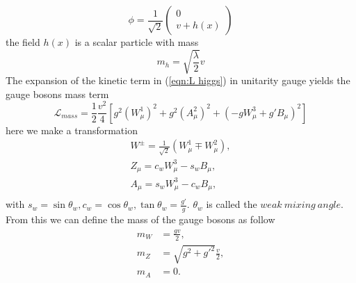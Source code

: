 \documentclass{report}
\numberwithin{equation}{section}
\begin{document}
\begin{equation}\label{7}
\phi=\frac{1}{\sqrt{2}}\begin{pmatrix}
0\\
v+h(x)
\end{pmatrix}
\end{equation}
the field $h(x)$ is a scalar particle with mass
\begin{equation}
m_h=\sqrt{\frac{\lambda}{2}}v
\end{equation}
The expansion of the kinetic term in (\ref{eqn:L higgs}) in unitarity gauge yields the gauge bosons mass term
\begin{equation}
\mathcal{L}_{mass}=\frac{1}{2}\frac{v^2}{4}\left[g^2(W^1_\mu)^2+g^2(A^2_\mu)^2+(-gW_\mu^3+g'B_\mu)^2\right]
\end{equation}
here we make a transformation
\begin{align}
W^{\pm}=\frac{1}{\sqrt{2}}(W_\mu^1\mp W^2_\mu),\\
Z_\mu=c_w W_\mu^3-s_wB_\mu,\\
A_\mu=s_w W_\mu^3-c_w B_\mu,\\
\end{align}
with $s_w=\sin \theta_w, c_w=\cos \theta_w,\tan \theta_w=\frac{g'}{g}$. $\theta_w$ is called the $weak\  mixing\ angle$. From this we can define the mass of the gauge bosons as follow
\begin{align}
m_W&=\frac{gv}{2},\\
m_Z&=\sqrt{g^2+g'^2}\frac{v}{2},\label{8}\\
m_A &= 0.
\end{align}
\end{document}
